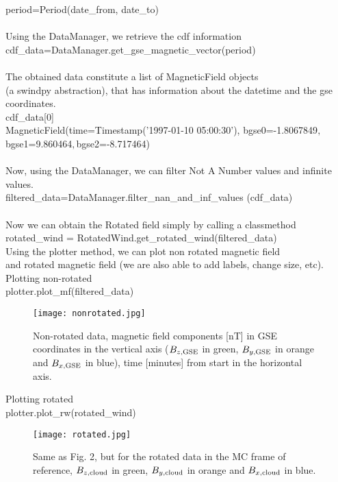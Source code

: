 \documentclass[baaa]{baaa}
\begin{document}
period=Period(date\_from, date\_to)\\
\\
Using the DataManager, we retrieve the cdf information\\
cdf\_data=DataManager.get\_gse\_magnetic\_vector(period)\\
\\
The obtained data constitute a list of MagneticField objects\\
(a swindpy abstraction), that has information  about the datetime and the gse coordinates.\\
cdf\_data[0]\\
MagneticField(time=Timestamp('1997-01-10 05:00:30'),
bgse0=-1.8067849$, $bgse1=9.860464$, $bgse2=-8.717464)\\
\\
Now, using the DataManager, we can filter Not A Number values and infinite values.\\
filtered\_data=DataManager.filter\_nan\_and\_inf\_values
(cdf\_data)\\
\\
Now we can obtain the Rotated field simply by calling a classmethod\\
rotated\_wind = RotatedWind.get\_rotated\_wind(filtered\_data)\\
Using the plotter method, we can plot non rotated magnetic field\\
and rotated magnetic field (we are also able to add labels, change size, etc). \\
Plotting non-rotated \\
plotter.plot\_mf(filtered\_data)\\
\begin{figure}[!t]
\centering
\texttt{[image: nonrotated.jpg]}
\caption{Non-rotated data, magnetic field components [nT] in GSE coordinates in the vertical axis ($B_{z, \rm GSE}$ in green, $B_{y, \rm GSE}$ in orange and $B_{x, \rm GSE}$ in blue), time [minutes] from start in the horizontal axis.}
\label{Fig2}
\end{figure}
Plotting rotated\\
plotter.plot\_rw(rotated\_wind)\\
\begin{figure}[!t]
\centering
\texttt{[image: rotated.jpg]}
\caption{Same as Fig. 2, but for the rotated data in the MC frame of reference, $B_{z, \rm cloud}$ in green, $B_{y, \rm cloud}$ in orange and $B_{x, \rm cloud}$ in blue.}
\label{Fig3}
\end{figure}
\end{document}
